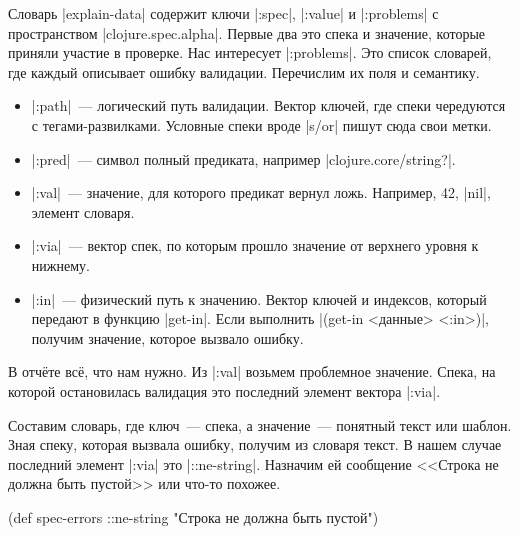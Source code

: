 Словарь \spverb|explain-data| содержит ключи \spverb|:spec|, \spverb|:value| и
\spverb|:problems| с пространством \spverb|clojure.spec.alpha|. Первые два это
спека и значение, которые приняли участие в проверке. Нас интересует
\spverb|:problems|. Это список словарей, где каждый описывает ошибку
валидации. Перечислим их поля и семантику.


\begin{itemize}

\item
  \spverb|:path|~--- логический путь валидации. Вектор ключей, где спеки
  чередуются с тегами-развилками. Условные спеки вроде \spverb|s/or| пишут сюда
  свои метки.

\item
  \spverb|:pred|~--- символ полный предиката, например
  \spverb|clojure.core/string?|.

\item
  \spverb|:val|~--- значение, для которого предикат вернул ложь. Например, 42,
  \spverb|nil|, элемент словаря.

\item
  \spverb|:via|~--- вектор спек, по которым прошло значение от верхнего уровня к
  нижнему.

\item
  \spverb|:in|~--- физический путь к значению. Вектор ключей и индексов, который
  передают в функцию \spverb|get-in|. Если выполнить \spverb|(get-in <данные> <:in>)|,
  получим значение, которое вызвало ошибку.

\end{itemize}

В отч\"{е}те вс\"{е}, что нам нужно. Из \spverb|:val| возьмем проблемное
значение. Спека, на которой остановилась валидация это последний элемент вектора
\spverb|:via|.

Составим словарь, где ключ~--- спека, а значение~--- понятный текст или
шаблон. Зная спеку, которая вызвала ошибку, получим из словаря текст. В нашем
случае последний элемент \spverb|:via| это \spverb|::ne-string|. Назначим ей
сообщение <<Строка не должна быть пустой>> или что-то похожее.

  \begin{clojure}
(def spec-errors
  {::ne-string "Строка не должна быть пустой"})
  \end{clojure}

